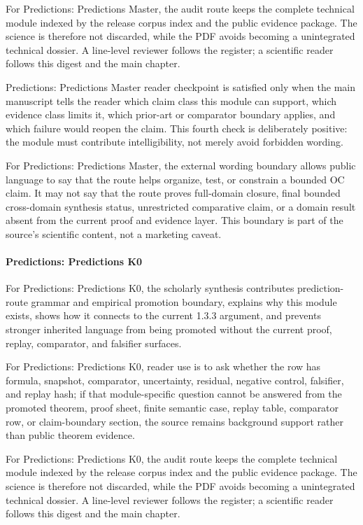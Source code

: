 For Predictions: Predictions Master, the audit route keeps the complete technical module indexed by the release corpus index and the public evidence package. The science is therefore not discarded, while the PDF avoids becoming a unintegrated technical dossier. A line-level reviewer follows the register; a scientific reader follows this digest and the main chapter.


Predictions: Predictions Master reader checkpoint is satisfied only when the main manuscript tells the reader which claim class this module can support, which evidence class limits it, which prior-art or comparator boundary applies, and which failure would reopen the claim. This fourth check is deliberately positive: the module must contribute intelligibility, not merely avoid forbidden wording.


For Predictions: Predictions Master, the external wording boundary allows public language to say that the route helps organize, test, or constrain a bounded OC claim. It may not say that the route proves full-domain closure, final bounded cross-domain synthesis status, unrestricted comparative claim, or a domain result absent from the current proof and evidence layer. This boundary is part of the source's scientific content, not a marketing caveat.


\paragraph{Predictions: Predictions K0}

For Predictions: Predictions K0, the scholarly synthesis contributes prediction-route grammar and empirical promotion boundary, explains why this module exists, shows how it connects to the current 1.3.3 argument, and prevents stronger inherited language from being promoted without the current proof, replay, comparator, and falsifier surfaces.


For Predictions: Predictions K0, reader use is to ask whether the row has formula, snapshot, comparator, uncertainty, residual, negative control, falsifier, and replay hash; if that module-specific question cannot be answered from the promoted theorem, proof sheet, finite semantic case, replay table, comparator row, or claim-boundary section, the source remains background support rather than public theorem evidence.


For Predictions: Predictions K0, the audit route keeps the complete technical module indexed by the release corpus index and the public evidence package. The science is therefore not discarded, while the PDF avoids becoming a unintegrated technical dossier. A line-level reviewer follows the register; a scientific reader follows this digest and the main chapter.


